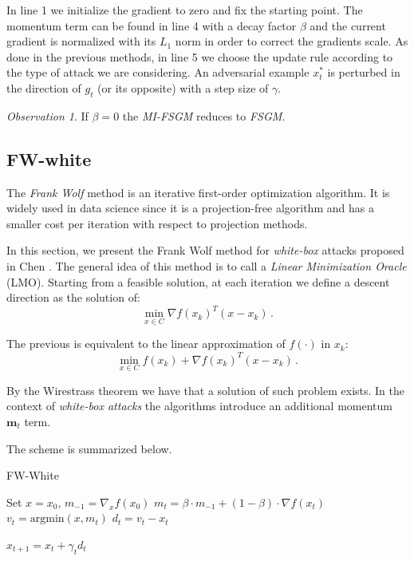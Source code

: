 \documentclass[10pt,twocolumn,letterpaper, english]{article}
\theoremstyle{definition}
\theoremstyle{plain}
\theoremstyle{plain}
\theoremstyle{plain}
\theoremstyle{plain}
\theoremstyle{remark}
\newtheorem{osservazione}{Observation}[section]
\theoremstyle{remark}
\theoremstyle{definition}
\theoremstyle{definition}
\theoremstyle{definition}
\theoremstyle{definition}
\begin{document}
In line 1 we initialize the gradient to zero and fix the starting point.
The momentum term can be found in line 4 with a decay factor $\beta$ and the current gradient is normalized with its $L_1$ norm in order to correct the gradients scale.
As done in the previous methods, in line 5 we choose the update rule according to the type of attack we are considering.
An adversarial example $x_{t}^{\ast}$ is perturbed in the direction of $g_t$ (or its opposite) with a step size of $\gamma$. 


\begin{osservazione}
If $\beta = 0$ the \textit{MI-FSGM} reduces to \textit{FSGM}.
\end{osservazione}


\subsection{FW-white}

The \textit{Frank Wolf} method is an iterative first-order optimization algorithm. 
It is widely used in data science since it is a projection-free algorithm and has a smaller cost per iteration with respect to projection methods.

In this section, we present the Frank Wolf method for \textit{white-box} attacks proposed in Chen \cite{frank}. 
The general idea of this method is to call a \textit{Linear Minimization Oracle} (LMO). 
Starting from a feasible solution, at each iteration we define a descent direction as the solution of:
\begin{equation*}
    \min_{x \in C}\nabla f(x_k)^T (x-x_k)\,.
\end{equation*}

The previous is equivalent to the linear approximation of $f(\cdot)$ in $x_k$:
\begin{equation*}
    \min_{x \in C} f(x_k) + \nabla f(x_k)^T (x-x_k)\,.
\end{equation*}

By the Wirestrass theorem we have that a solution of such problem exists.
In the context of \textit{white-box attacks} the algorithms introduce an additional momentum $\textbf{m}_t$ term. 

The scheme is summarized below.
\begin{algorithm}
\caption{FW-White}\label{FW}
\begin{algorithmic}[1]

\State Set $x = x_0$, $m_{-1} = \nabla_x f(x_0)$
    \State $m_t = \beta \cdot m_{-1} + (1-\beta) \cdot \nabla f(x_t) $
    \State $v_t = \text{argmin} (x, m_t) $
    \State $d_t = v_t - x_t $
    
        
    \State $x_{t+1} = x_t + \gamma_t d_t $
    
    
    
\EndFor
\end{algorithmic}
\end{algorithm}
\end{document}
